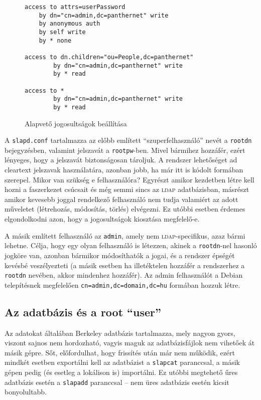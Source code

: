 \begin{figure}
\begin{Verbatim}[frame=single]
access to attrs=userPassword
    by dn="cn=admin,dc=panthernet" write
    by anonymous auth
    by self write
    by * none

access to dn.children="ou=People,dc=panthernet"
        by dn="cn=admin,dc=panthernet" write
        by * read

access to *
        by dn="cn=admin,dc=panthernet" write
        by * read
\end{Verbatim}
  \caption{Alapvető jogosultságok beállítása}
  \label{fig:ldap-acl}
\end{figure}


A \texttt{slapd.conf} tartalmazza az előbb említett ``szuperfelhasználó''  nevét a \texttt{rootdn} bejegyzésben,
valamint jelszavát a \texttt{rootpw}-ben. Mivel bármihez hozzáfér, ezért lényeges, hogy a jelszavát biztonságosan
tároljuk. A rendszer lehetőséget ad cleartext jelszavak használatára, azonban jobb, ha már itt is kódolt formában
szerepel. Mikor van szükség e felhasználóra? Egyrészt amikor kezdetben létre kell hozni a faszerkezet csúcsait és még
semmi sincs az \textsc{ldap} adatbázisban, másrészt amikor kevesebb joggal rendelkező felhasználó nem tudja valamiért az
adott műveletet (létrehozás, módosítás, törlés) elvégezni. Ez utóbbi esetben érdemes elgondolkodni azon, hogy a
jogosultságok kiosztása megfelelő-e.

A másik említett felhasználó az \texttt{admin}, amely nem \textsc{ldap}-specifikus, azaz bármi lehetne. Célja, hogy egy
olyan felhasználó is létezzen, akinek a \texttt{rootdn}-nel hasonló jogköre van, azonban bármikor módosíthatók a jogai,
és a rendszer épségét kevésbé veszélyezteti (a másik esetben ha illetéktelen hozzáfér a rendszerhez a \texttt{rootdn}
nevében, akkor mindenhez hozzáfér). Az admin felhasználót a Debian telepítésnek megfelelően
\texttt{cn=admin,dc=domain,dc=hu} formában hozzuk létre.





\subsection{Az adatbázis és a root ``user''} Az adatokat általában Berkeley adatbázis tartalmazza, mely nagyon
gyors, viszont sajnos nem hordozható, vagyis maguk az adatbázisfájlok nem vihetőek át másik gépre. Sőt, előfordulhat,
hogy frissítés után már nem működik, ezért mindkét esetben exportálni kell az adatbázist a \texttt{slapcat} paranccsal,
a másik gépen pedig (és esetleg a lokálison is) importálni. Ez utóbbi megtehető űres adatbázis esetén a \texttt{slapadd}
paranccsal -- nem üres adatbázis esetén kicsit bonyolultabb.


